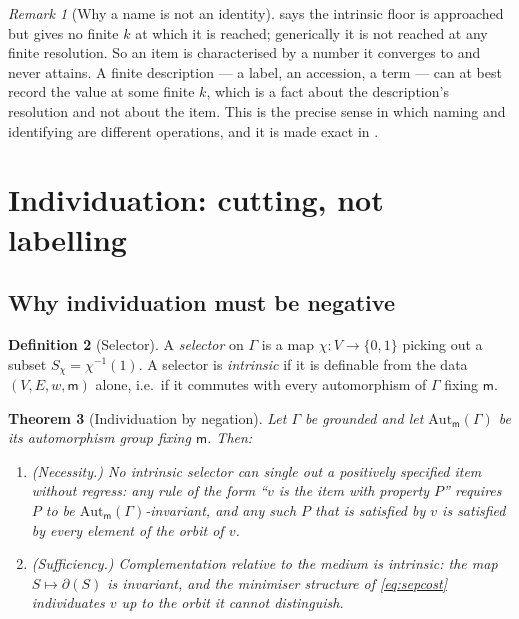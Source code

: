 \documentclass[11pt,twocolumn,a4paper]{article}
\theoremstyle{thmstyle}
\newtheorem{theorem}{Theorem}[section]
\theoremstyle{definition}
\newtheorem{definition}[theorem]{Definition}
\theoremstyle{remark}
\newtheorem{remark}[theorem]{Remark}
\newcommand{\Gph}{\Gamma}
\newcommand{\V}{V}
\newcommand{\E}{E}
\newcommand{\wt}{w}
\newcommand{\med}{\mathsf{m}}
\newcommand{\cut}{\partial}
\begin{document}
\begin{remark}[Why a name is not an identity]
\label{rem:name}
 says the intrinsic floor is approached but gives
no finite $k$ at which it is reached; generically it is not reached at
any finite resolution. So an item is characterised by a number it
converges to and never attains. A finite description --- a label, an
accession, a term --- can at best record the value at some finite $k$,
which is a fact about the description's resolution and not about the
item. This is the precise sense in which naming and identifying are
different operations, and it is made exact in .
\end{remark}

\section{Individuation: cutting, not labelling}
\label{sec:individuation}

\subsection{Why individuation must be negative}

\begin{definition}[Selector]
\label{def:selector}
A \emph{selector} on $\Gph$ is a map $\chi \colon \V \to \{0,1\}$
picking out a subset $S_\chi = \chi^{-1}(1)$. A selector is
\emph{intrinsic} if it is definable from the data
$(\V, \E, \wt, \med)$ alone, i.e.\ if it commutes with every
automorphism of $\Gph$ fixing $\med$.
\end{definition}

\begin{theorem}[Individuation by negation]
\label{thm:negation}
Let $\Gph$ be grounded and let $\mathrm{Aut}_\med(\Gph)$ be its
automorphism group fixing $\med$. Then:
\begin{enumerate}
\item[(i)] \textup{(Necessity.)} No intrinsic selector can single out
a positively specified item without regress: any rule of the form
``$v$ is the item with property $P$'' requires $P$ to be
$\mathrm{Aut}_\med(\Gph)$-invariant, and any such $P$ that is
satisfied by $v$ is satisfied by every element of the orbit of $v$.
\item[(ii)] \textup{(Sufficiency.)} Complementation relative to the
medium \emph{is} intrinsic: the map $S \mapsto \cut(S)$ is invariant,
and the minimiser structure of \eqref{eq:sepcost} individuates $v$ up
to the orbit it cannot distinguish.
\end{enumerate}
\end{theorem}
\end{document}
